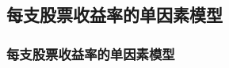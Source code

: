
\begin{issues}
\issueMissDepend
\end{issues}

\subsection{每支股票收益率的单因素模型}
\subsubsection{每支股票收益率的单因素模型}




